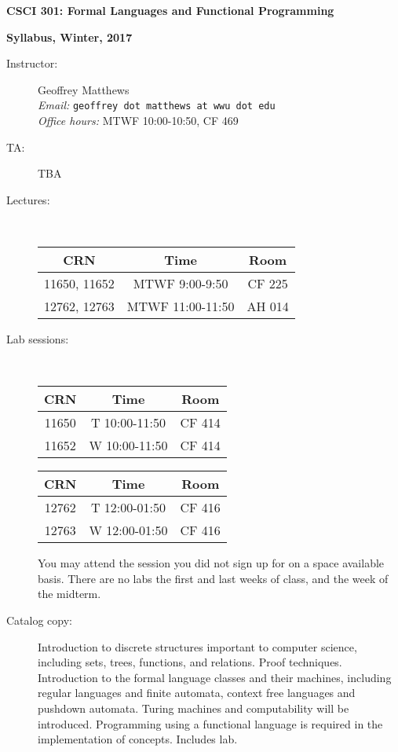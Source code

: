 \documentclass{article}
\begin{document}
\centerline{\Large\bf CSCI 301: Formal Languages and Functional Programming}
\centerline{\large\bf Syllabus, Winter, 2017}


\begin{description}


\item[Instructor:] Geoffrey Matthews\\
{\em Email:} {\tt geoffrey dot matthews at wwu dot edu}\\
{\em Office hours:} MTWF 10:00-10:50, CF 469

\item[TA:]  TBA

\item[Lectures:] \mbox{}\\
\begin{tabular}{ccc}
  CRN & Time & Room \\\hline
  11650, 11652 & MTWF 9:00-9:50 & CF 225 \\
  12762, 12763 & MTWF 11:00-11:50 & AH 014 
  \end{tabular}

\item[Lab sessions:]\mbox{}\\
  \hfill
  \begin{tabular}{ccc}
    CRN & Time & Room \\\hline
  11650 & T 10:00-11:50 & CF 414\\
  11652 & W 10:00-11:50 & CF 414\\
  \end{tabular}
  \hfill
  \begin{tabular}{ccc}
    CRN & Time & Room \\\hline
  12762 & T 12:00-01:50 & CF 416 \\
  12763 & W 12:00-01:50 & CF 416
  \end{tabular}
  \hfill
  \mbox{}
  
You may attend the session you did not sign up for on a space
available basis.  There are no labs the first and last weeks of class,
and the week of the midterm.

\item[Catalog copy:] Introduction to discrete structures important to
  computer science, including sets, trees, functions, and
  relations. Proof techniques. Introduction to the formal language
  classes and their machines, including regular languages and finite
  automata, context free languages and pushdown automata. Turing
  machines and computability will be introduced. Programming using a
  functional language is required in the implementation of
  concepts. Includes lab.


\end{description}
\end{document}
